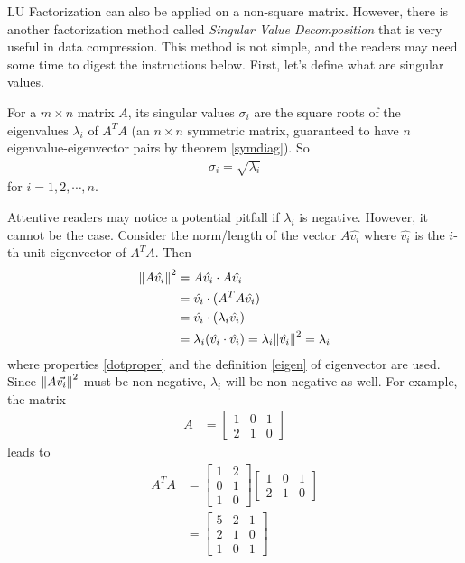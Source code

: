 LU Factorization can also be applied on a non-square matrix. However, there is another factorization method called \textit{Singular Value Decomposition} that is very useful in data compression. This method is not simple, and the readers may need some time to digest the instructions below. First, let's define what are singular values.
\begin{defn}
For a $m \times n$ matrix $A$, its singular values $\sigma_i$ are the square roots of the eigenvalues $\lambda_i$ of $A^TA$ (an $n \times n$ symmetric matrix, guaranteed to have $n$ eigenvalue-eigenvector pairs by theorem \ref{symdiag}). So
\begin{align*}
\sigma_i = \sqrt{\lambda_i}
\end{align*}
for $i = 1, 2, \cdots, n$.
\end{defn}
Attentive readers may notice a potential pitfall if $\lambda_i$ is negative. However, it cannot be the case. Consider the norm/length of the vector $A\hat{v_i}$ where $\hat{v_i}$ is the $i$-th unit eigenvector of $A^TA$. Then
\begin{align*}
\norm{A\hat{v_i}}^2 &= A\hat{v_i} \cdot A\hat{v_i}\\
&= \hat{v_i} \cdot (A^TA\hat{v_i}) \\
&= \hat{v_i} \cdot (\lambda_i\hat{v_i}) \\
&= \lambda_i (\hat{v_i} \cdot \hat{v_i}) = \lambda_i \norm{\hat{v_i}}^2 = \lambda_i
\end{align*}
where properties \ref{dotproper} and the definition \ref{eigen} of eigenvector are used. Since $\norm{A\vec{v_i}}^2$ must be non-negative, $\lambda_i$ will be non-negative as well. For example, the matrix
\begin{align*}
A &= 
\begin{bmatrix}
1 & 0 & 1\\
2 & 1 & 0
\end{bmatrix}
\end{align*}
leads to
\begin{align*}
A^TA &= 
\begin{bmatrix}
1 & 2\\
0 & 1 \\
1 & 0
\end{bmatrix} 
\begin{bmatrix}
1 & 0 & 1\\
2 & 1 & 0
\end{bmatrix} \\
&=
\begin{bmatrix}
5 & 2 & 1 \\
2 & 1 & 0 \\
1 & 0 & 1
\end{bmatrix}
\end{align*}

